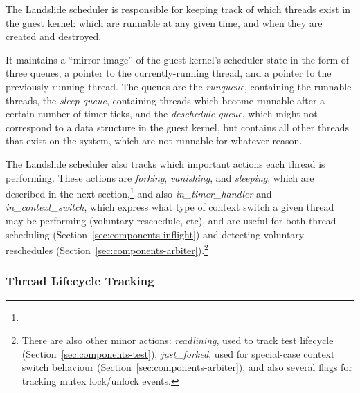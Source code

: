 The Landslide scheduler is responsible for keeping track of which threads exist in the guest kernel: which are runnable at any given time, and when they are created and destroyed.

It maintains a ``mirror image'' of the guest kernel's scheduler state in the form of three queues, a pointer to the currently-running thread, and a pointer to the previously-running thread. The queues are the {\em runqueue}, containing the runnable threads, the {\em sleep queue}, containing threads which become runnable after a certain number of timer ticks, and the {\em deschedule queue}, which might not correspond to a data structure in the guest kernel, but contains all other threads that exist on the system, which are not runnable for whatever reason.

The Landslide scheduler also tracks which important actions each thread is performing. These actions are {\em forking}, {\em vanishing}, and {\em sleeping}, which are described in the next section,\footnote{} and also {\em in\_timer\_handler} and {\em in\_context\_switch}, which express what type of context switch a given thread may be performing (voluntary reschedule, etc), and are useful for both thread scheduling (Section~\ref{sec:components-inflight}) and detecting voluntary reschedules (Section~\ref{sec:components-arbiter}).\footnote{
There are also other minor actions: {\em readlining}, used to track test lifecycle (Section~\ref{sec:components-test}), {\em just\_forked}, used for special-case context switch behaviour (Section~\ref{sec:components-arbiter}), and also several flags for tracking mutex lock/unlock events.}

\subsubsection{Thread Lifecycle Tracking}

